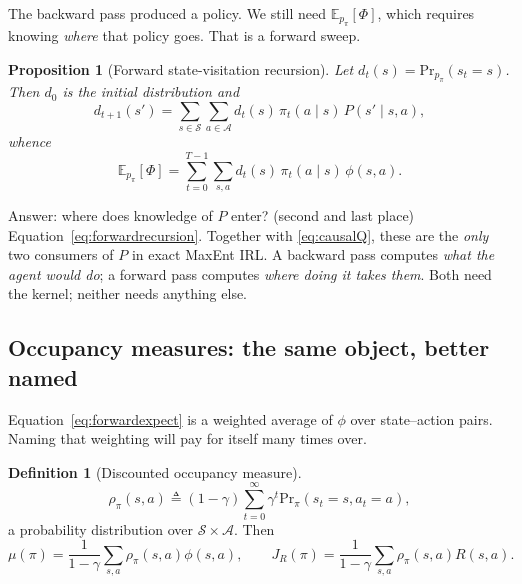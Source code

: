 \documentclass[11pt]{article}
\theoremstyle{plain}
\newtheorem{proposition}[theorem]{Proposition}
\theoremstyle{definition}
\newtheorem{definition}[theorem]{Definition}
\theoremstyle{remark}
\renewcommand{\S}{\mathcal{S}}
\newcommand{\A}{\mathcal{A}}
\newcommand{\E}{\mathbb{E}}
\newcommand{\Prb}{\mathrm{Pr}}
\begin{document}
The backward pass produced a policy. We still need $\E_{p_\pi}[\Phi]$,
which requires knowing \emph{where} that policy goes. That is a forward
sweep.

\begin{proposition}[Forward state-visitation recursion]
Let $d_t(s) = \Prb_{p_\pi}(s_t=s)$. Then $d_0$ is the initial distribution
and
\begin{equation}
d_{t+1}(s') = \sum_{s\in\S}\sum_{a\in\A} d_t(s)\,\pi_t(a\mid s)\,P(s'\mid s,a),
\label{eq:forwardrecursion}
\end{equation}
whence
\begin{equation}
\E_{p_\pi}[\Phi] = \sum_{t=0}^{T-1}\sum_{s,a} d_t(s)\,\pi_t(a\mid s)\,\phi(s,a).
\label{eq:forwardexpect}
\end{equation}
\end{proposition}

\begin{graybox}{Answer: where does knowledge of $P$ enter? (second and
last place)}
Equation~\eqref{eq:forwardrecursion}. Together with \eqref{eq:causalQ},
these are the \emph{only} two consumers of $P$ in exact MaxEnt IRL. A
backward pass computes \emph{what the agent would do}; a forward pass
computes \emph{where doing it takes them}. Both need the kernel; neither
needs anything else.
\end{graybox}

\subsection{Occupancy measures: the same object, better named}
\label{sec:occupancy}

Equation~\eqref{eq:forwardexpect} is a weighted average of $\phi$ over
state--action pairs. Naming that weighting will pay for itself many times
over.

\begin{definition}[Discounted occupancy measure]
\begin{equation}
\rho_\pi(s,a) \triangleq (1-\gamma)\sum_{t=0}^\infty \gamma^t \Prb_\pi(s_t=s,a_t=a),
\label{eq:occupancydef}
\end{equation}
a probability distribution over $\S\times\A$. Then
\begin{equation}
\mu(\pi) = \frac1{1-\gamma}\sum_{s,a}\rho_\pi(s,a)\phi(s,a), \qquad
J_R(\pi) = \frac1{1-\gamma}\sum_{s,a}\rho_\pi(s,a)R(s,a).
\label{eq:occupancylinear}
\end{equation}
\end{definition}
\end{document}
